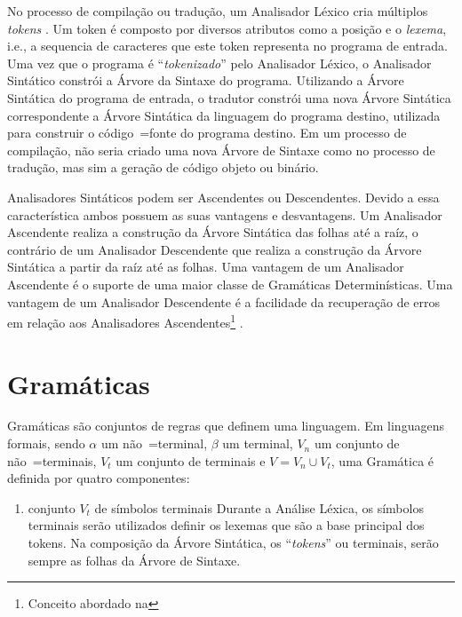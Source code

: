 {    No processo de compilação ou tradução,
    um Analisador Léxico cria múltiplos \textit{tokens} \cite{ahoCompilerDragonBook}.
    Um token é composto por diversos atributos como a posição e
    o \textit{lexema}, i.e.,
    a sequencia de caracteres que este token representa no programa de entrada.
    Uma vez que o programa é ``\textit{tokenizado}'' pelo Analisador Léxico,
    o Analisador Sintático constrói a Árvore da Sintaxe do programa.
    Utilizando a Árvore Sintática do programa de entrada,
    o tradutor constrói uma nova Árvore Sintática correspondente a
    Árvore Sintática da linguagem do programa destino,
    utilizada para construir o código~=fonte do programa destino.
    Em um processo de compilação,
    não seria criado uma nova Árvore de Sintaxe como no processo de tradução,
    mas sim a geração de código objeto ou binário.

    Analisadores Sintáticos podem ser Ascendentes ou Descendentes.
    Devido a essa característica ambos possuem as suas vantagens e
    desvantagens.
    Um Analisador Ascendente realiza a construção da Árvore Sintática das folhas até a raíz,
    o contrário de um Analisador Descendente que realiza a construção
    da Árvore Sintática a partir da raíz até as folhas.
    Uma vantagem de um Analisador Ascendente é o suporte
    de uma maior classe de Gramáticas Determinísticas.
    Uma vantagem de um Analisador Descendente é a facilidade da recuperação de erros em
    relação aos Analisadores Ascendentes\footnote{Conceito abordado na
    } \cite{sippu1982,lr1ErrorRecovery,larkJosefGrosch}.


\section{Gramáticas}

    Gramáticas são conjuntos de regras que definem uma linguagem.
    Em linguagens formais,
    sendo $\alpha$ um não~=terminal,
    $\beta$ um terminal,
    $V_n$ um conjunto de não~=terminais,
    $V_t$ um conjunto de terminais e
    $V = V_n \cup V_t$,
    uma Gramática é definida por quatro componentes:
    \begin{enumerate}%
        \item {} conjunto $V_t$ de símbolos terminais
        Durante a Análise Léxica,
        os símbolos terminais serão utilizados definir os lexemas que são a base principal dos tokens.
        Na composição da Árvore Sintática,
        os ``\textit{tokens}'' ou terminais,
        serão sempre as folhas da Árvore de Sintaxe.


\end{enumerate}}
